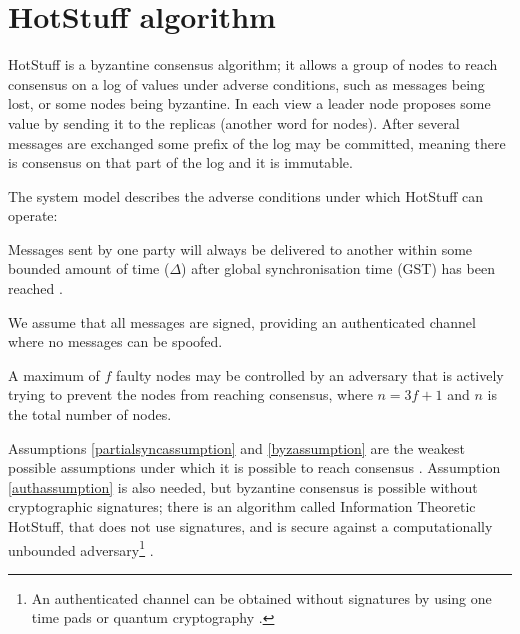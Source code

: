 \section{HotStuff algorithm} \label{hotstufftheory}
HotStuff is a byzantine consensus algorithm; it allows a group of nodes to reach consensus on a log of values under adverse conditions, such as messages being lost, or some nodes being byzantine. In each view a leader node proposes some value by sending it to the replicas (another word for nodes). After several messages are exchanged some prefix of the log may be committed, meaning there is consensus on that part of the log and it is immutable.

The system model describes the adverse conditions under which HotStuff can operate:
\begin{assumption} \label{partialsyncassumption}
	Messages sent by one party will always be delivered to another within some bounded amount of time ($\Delta$) after global synchronisation time (GST) has been reached \cite{dworkConsensusPresencePartial1988}.
\end{assumption}

\begin{assumption}[Authenticated] \label{authassumption}
	We assume that all messages are signed, providing an authenticated channel where no messages can be spoofed.
\end{assumption}

\begin{assumption}[Byzantine] \label{byzassumption}
	A maximum of $f$ faulty nodes may be controlled by an adversary that is actively trying to prevent the nodes from reaching consensus, where $n = 3f + 1$ and $n$ is the total number of nodes.
\end{assumption}

Assumptions \ref{partialsyncassumption} and \ref{byzassumption} are the weakest possible assumptions under which it is possible to reach consensus \cite{peaseReachingAgreementPresence1980,fischerEasyImpossibilityProofs1986}. Assumption \ref{authassumption} is also needed, but byzantine consensus is possible without cryptographic signatures; there is an algorithm called Information Theoretic HotStuff, that does not use signatures, and is secure against a computationally unbounded adversary\footnote{An authenticated channel can be obtained without signatures by using one time pads or quantum cryptography \cite{bennettExperimentalQuantumCryptography1992}.} \cite{abrahamInformationTheoreticHotStuff2020}.

